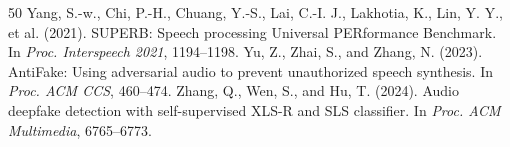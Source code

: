 \documentclass[10pt,a4paper,twocolumn]{article}
\begin{document}
{\begin{thebibliography}{50}
 Yang, S.-w., Chi, P.-H., Chuang, Y.-S., Lai, C.-I. J., Lakhotia, K., Lin, Y. Y., et al. (2021). SUPERB: Speech processing Universal PERformance Benchmark. In \emph{Proc. Interspeech 2021}, 1194--1198.
 Yu, Z., Zhai, S., and Zhang, N. (2023). AntiFake: Using adversarial audio to prevent unauthorized speech synthesis. In \emph{Proc. ACM CCS}, 460--474.
 Zhang, Q., Wen, S., and Hu, T. (2024). Audio deepfake detection with self-supervised XLS-R and SLS classifier. In \emph{Proc. ACM Multimedia}, 6765--6773.
\end{thebibliography}
}
\end{document}
